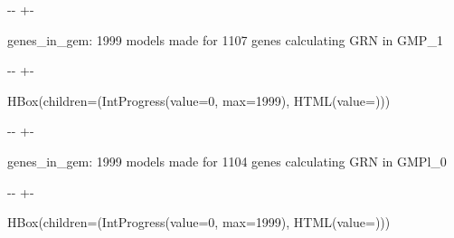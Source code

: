 \documentclass[letterpaper,10pt,english]{sphinxmanual}
\newlength\nbsphinxcodecellspacing
\begin{document}
%
{
\kern-\sphinxverbatimsmallskipamount\kern-\baselineskip
\kern+\FrameHeightAdjust\kern-\fboxrule
\vspace{\nbsphinxcodecellspacing}
%
\begin{sphinxVerbatim}[commandchars=\\\{\}]

genes\_in\_gem: 1999
models made for 1107 genes
calculating GRN in GMP\_1
\end{sphinxVerbatim}
}
\relax

{

\kern-\sphinxverbatimsmallskipamount\kern-\baselineskip
\kern+\FrameHeightAdjust\kern-\fboxrule
\vspace{\nbsphinxcodecellspacing}

%
\begin{sphinxVerbatim}[commandchars=\\\{\}]
HBox(children=(IntProgress(value=0, max=1999), HTML(value=\PYGZsq{}\PYGZsq{})))
\end{sphinxVerbatim}
}



%
{
\kern-\sphinxverbatimsmallskipamount\kern-\baselineskip
\kern+\FrameHeightAdjust\kern-\fboxrule
\vspace{\nbsphinxcodecellspacing}
%
\begin{sphinxVerbatim}[commandchars=\\\{\}]

genes\_in\_gem: 1999
models made for 1104 genes
calculating GRN in GMPl\_0
\end{sphinxVerbatim}
}
\relax

{

\kern-\sphinxverbatimsmallskipamount\kern-\baselineskip
\kern+\FrameHeightAdjust\kern-\fboxrule
\vspace{\nbsphinxcodecellspacing}

%
\begin{sphinxVerbatim}[commandchars=\\\{\}]
HBox(children=(IntProgress(value=0, max=1999), HTML(value=\PYGZsq{}\PYGZsq{})))
\end{sphinxVerbatim}
}
\end{document}
